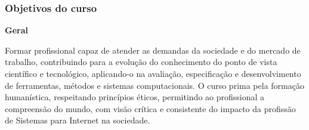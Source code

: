 

\subsubsection{Objetivos do curso}

\textbf{Geral}

\vspace{5mm}
Formar profissional capaz de atender as demandas da sociedade e do mercado de trabalho, contribuindo para a evolução do conhecimento do ponto de vista científico e tecnológico, aplicando-o na avaliação, especificação e desenvolvimento de ferramentas, métodos e sistemas computacionais. O curso prima pela formação humanística, respeitando princípios éticos, permitindo ao profissional a compreensão do mundo, com visão crítica e consistente do impacto da profissão de Sistemas para Internet na sociedade.


